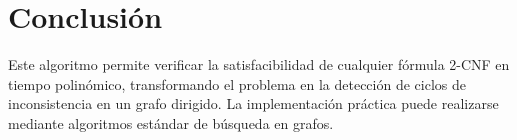 \documentclass[a4paper,12pt]{article}
\begin{document}
\section{Conclusión}

Este algoritmo permite verificar la satisfacibilidad de cualquier fórmula 2-CNF en tiempo polinómico, transformando el problema en la detección de ciclos de inconsistencia en un grafo dirigido. La implementación práctica puede realizarse mediante algoritmos estándar de búsqueda en grafos.
\end{document}
